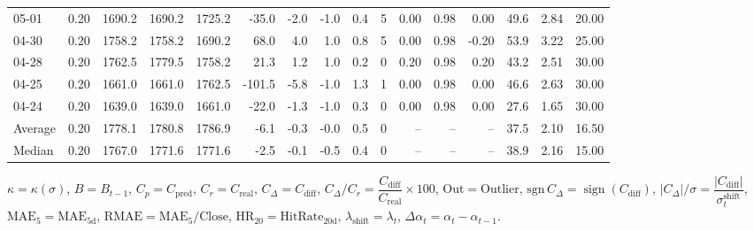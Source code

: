 \begin{threeparttable}
{\begin{tabular}{lrrrrrrrrrrrrrrr}
  05-01 &     0.20 & 1690.2 & 1690.2 & 1725.2 &      -35.0 &           -2.0 &                     -1.0 &                 0.4 &              5 &       0.00 &      0.98 &           0.00 &             49.6 &            2.84 &                  20.00 \\
  04-30 &     0.20 & 1758.2 & 1758.2 & 1690.2 &       68.0 &            4.0 &                      1.0 &                 0.8 &              5 &       0.00 &      0.98 &          -0.20 &             53.9 &            3.22 &                  25.00 \\
  04-28 &     0.20 & 1762.5 & 1779.5 & 1758.2 &       21.3 &            1.2 &                      1.0 &                 0.2 &              0 &       0.20 &      0.98 &           0.20 &             43.2 &            2.51 &                  30.00 \\
  04-25 &     0.20 & 1661.0 & 1661.0 & 1762.5 &     -101.5 &           -5.8 &                     -1.0 &                 1.3 &              1 &       0.00 &      0.98 &           0.00 &             46.6 &            2.63 &                  30.00 \\
  04-24 &     0.20 & 1639.0 & 1639.0 & 1661.0 &      -22.0 &           -1.3 &                     -1.0 &                 0.3 &              0 &       0.00 &      0.98 &           0.00 &             27.6 &            1.65 &                  30.00 \\
Average &     0.20 & 1778.1 & 1780.8 & 1786.9 &       -6.1 &           -0.3 &                     -0.0 &                 0.5 &              0 &         -- &        -- &             -- &             37.5 &            2.10 &                  16.50 \\
 Median &     0.20 & 1767.0 & 1771.6 & 1771.6 &       -2.5 &           -0.1 &                     -0.5 &                 0.4 &              0 &         -- &        -- &             -- &             38.9 &            2.16 &                  15.00 \\
\bottomrule
\end{tabular}
}
\begin{tablenotes}\footnotesize
\item $\kappa=\kappa(\sigma)$, $B=B_{t-1}$, $C_p=C_{\text{pred}}$, $C_r=C_{\text{real}}$, $C_\Delta=C_{\text{diff}}$, $C_\Delta/C_r=\dfrac{C_{\text{diff}}}{C_{\text{real}}}\times100$, $\mathrm{Out}=\text{Outlier}$, $\mathrm{sgn}\,C_\Delta=\operatorname{sign}(C_{\text{diff}})$, $|C_\Delta|/\sigma=\dfrac{|C_{\text{diff}}|}{\sigma_t^{\text{shift}}}$, $\mathrm{MAE}_5=\mathrm{MAE}_{5\text{d}}$, $\mathrm{RMAE}= \mathrm{MAE}_5 / \text{Close}$, $\mathrm{HR}_{20}=\mathrm{HitRate}_{20\text{d}}$, 
$\lambda_{\text{shift}}=\lambda_t$, 
$\Delta\alpha_t=\alpha_t-\alpha_{t-1}$.
\end{tablenotes}
\end{threeparttable}
\endgroup

